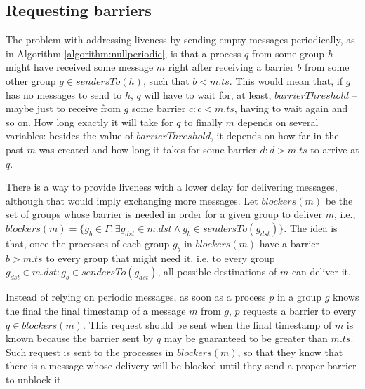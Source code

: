 \documentclass[times, 10pt]{article}
\begin{document}
\subsection{Requesting barriers}
\label{sec:nullondemand}

The problem with addressing liveness by sending empty messages periodically, as in Algorithm \ref{algorithm:nullperiodic}, is that a process $q$ from some group $h$ might have received some message $m$ right after receiving a barrier $b$ from some other group $g \in sendersTo(h)$, such that $b < m.ts$. This would mean that, if $g$ has no messages to send to $h$, $q$ will have to wait for, at least, $barrierThreshold$ -- maybe just to receive from $g$ some barrier $c : c < m.ts$, having to wait again and so on. How long exactly it will take for $q$ to finally \amdel{} $m$ depends on several variables: besides the value of $barrierThreshold$, it depends on how far in the past $m$ was created and how long it takes for some barrier $d: d > m.ts$ to arrive at $q$.%

There is a way to provide liveness with a lower delay for delivering messages, although that would imply exchanging more messages. Let $blockers(m)$ be the set of groups whose barrier is needed in order for a given group to deliver $m$, i.e., \mbox{$blockers(m) = \{g_b \in \Gamma: \exists g_{dst} \in m.dst \wedge g_b \in sendersTo(g_{dst})\}$}. The idea is that, once the processes of each group $g_b$ in $blockers(m)$ have \rmcast{} a barrier $b > m.ts$ to every group that might need it, i.e. to every group \mbox{$g_{dst} \in m.dst : g_b \in sendersTo(g_{dst})$}, all possible destinations of $m$ can deliver it. 

Instead of relying on periodic messages, as soon as a process $p$ in a group $g$ knows the final the final timestamp of a message $m$ from $g$, $p$ requests a barrier to every $q \in blockers(m)$. This request should be sent when the final timestamp of $m$ is known because the barrier sent by $q$ may be guaranteed to be greater than $m.ts$. Such request is sent to the processes in $blockers(m)$, so that they know that there is a message whose delivery will be blocked until they send a proper barrier to unblock it.%
\end{document}
